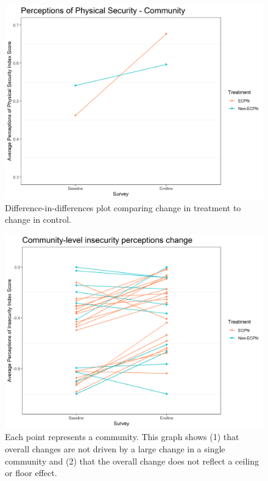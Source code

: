 \documentclass[
]{article}
\begin{document}
\begin{figure}[H]
\centering
\includegraphics[width=\linewidth]{../data_and_code/survey_dat/figs/did_plots/finished_didPlots/inComm_plot.png}
\caption{Difference-in-differences plot comparing change in treatment to change in control.}\label{fig:in_comm}
\end{figure}

\begin{figure}[H]
\centering
\includegraphics[width=\linewidth]{../data_and_code/survey_dat/figs/did_plots/inComm_plot_disag.png}
\caption{Each point represents a community. This graph shows (1) that overall changes are not driven by a large change in a single community and (2) that the overall change does not reflect a ceiling or floor effect.}\label{fig:in_comm_dis}
\end{figure}
\end{document}
